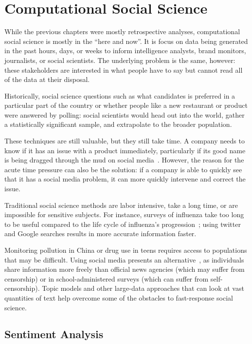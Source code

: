 
\chapter{Computational Social Science}
\label{ch:css}

While the previous chapters were mostly retrospective analyses, computational
social science is mostly in the ``here and now''.  It is focus on data
being generated in the past hours, days, or weeks to inform
intelligence analysts, brand monitors, journalists, or social
scientists.  The underlying problem is the same, however: these
stakeholders are interested in what people have to say but cannot read
all of the data at their disposal.

Historically, social science questions such as what candidates is
preferred in a particular part of the country or whether people like a
new restaurant or product were answered by polling: social scientists
would head out into the world, gather a statistically significant
sample, and extrapolate to the broader population.

These techniques are still valuable, but they still take time.  A
company needs to know if it has an issue with a product immediately,
particularly if its good name is being dragged through the mud on
social media~\cite{bowen-16}.  However, the reason for the acute time
pressure can also be the solution: if a company is able to quickly see
that it has a social media problem, it can more quickly intervene and
correct the issue.

Traditional social science methods are labor intensive, take a long
time, or are impossible for sensitive subjects.  For instance, surveys
of influenza take too long to be useful compared to the life cycle of
influenza's progression~\cite{broniatowsky-15}; using twitter and
Google searches results in more accurate information faster.

Monitoring pollution in China or drug use in teens requires access to
populations that may be difficult.  Using social media presents an
alternative~\cite{wang:paul:dredze-15}, as individuals share
information more freely than official news agencies (which may suffer
from censorship) or in school-administered surveys (which can suffer
from self-censorship).  Topic models and other large-data approaches
that can look at vast quantities of text help overcome some of the
obstacles to fast-response social science.

\section{Sentiment Analysis}

